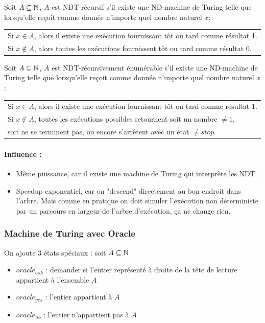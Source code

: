 \begin{mydef} Soit $A\subseteq \mathbb{N}$, $A$ est NDT-récursif s'il 
	existe une ND-machine de Turing telle que lorsqu'elle reçoit comme 
	donnée n'importe quel nombre naturel $x$:\\
	\begin{tabular}{l}
		Si $x\in A$, alors il existe une exécution fournissant tôt ou 
		tard comme résultat 1.\\
		Si $x\notin A$, alors toutes les exécutions fournissent tôt ou 
		tard comme résultat 0.\\
	\end{tabular}
\end{mydef}

\begin{mydef} Soit $A\subseteq \mathbb{N}$, $A$ est 
	NDT-récursivement énumérable s'il 
	existe une ND-machine de Turing telle que lorsqu'elle reçoit comme 
	donnée n'importe quel nombre naturel $x$:\\
	\begin{tabular}{l}
		Si $x\in A$, alors il existe une exécution fournissant tôt ou 
		tard comme résultat 1.\\
		Si $x\notin A$, toutes les exécutions possibles retournent soit un 
		nombre $\neq 1$, \\
		soit ne se terminent pas, ou encore s'arrêtent avec 
		un état $\neq stop$.\\
	\end{tabular}
\end{mydef}

\paragraph{Influence :} 
\begin{itemize}
	\item Même puissance, car il existe une machine de Turing qui interprète
	 les NDT.
	\item Speedup exponentiel, car on "descend" directement au bon endroit 
		dans l'arbre. Mais comme en pratique on doit simuler 
		l'exécution non déterministe par un parcours en largeur de l'arbre d'exécution,
		 ça ne change rien.
\end{itemize}

\subsubsection{Machine de Turing avec Oracle}
On ajoute 3 états spéciaux : soit $A \subseteq \mathbb{N}$
\begin{itemize}
	\item $oracle_{ask}$ : demander si l'entier représenté à droite de la 
		tête de lecture appartient à l'ensemble $A$
	\item $oracle_{yes}$ : l'entier appartient à $A$
	\item $oracle_{no}$ :  l'entier n'appartient pas à $A$
\end{itemize}

